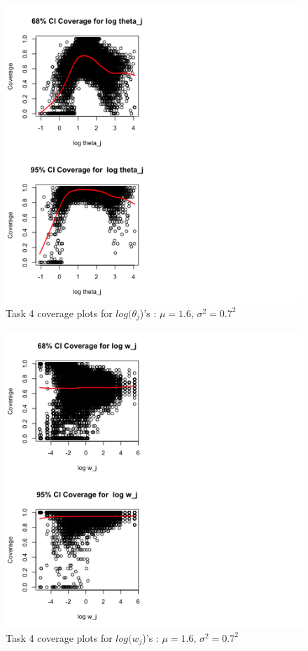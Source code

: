 \documentclass[paper=a4, fontsize=11pt]{scrartcl}
\begin{document}
\begin{figure}[h!]
  \caption{Task 4 coverage plots for $log(\theta_{j}$)'s : $\mu = 1.6$, $\sigma^2 = 0.7^2$}
  \centering
	\includegraphics[scale=1, trim = 0 0 200 0]{keskici_wxiao_ps2_task4_plot1.png}
\end{figure}

\begin{figure}[h!]
  \caption{Task 4 coverage plots for $log(w_{j}$)'s : $\mu = 1.6$, $\sigma^2 = 0.7^2$}
  \centering
	\includegraphics[scale=1, trim = 0 0 200 0]{keskici_wxiao_ps2_task4_plot2.png}
\end{figure}
\end{document}
